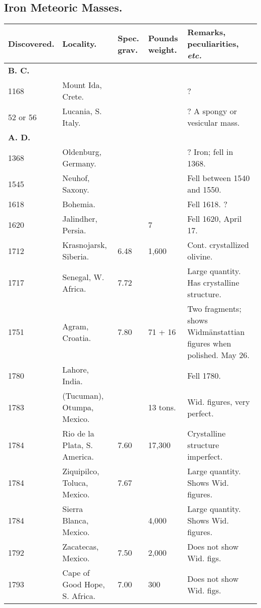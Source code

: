 \documentclass[a4paper, 12pt, oneside]{article}
\begin{document}
\subsection{Iron Meteoric Masses.}
\begin{center}
    \footnotesize
    \begin{longtable}{|p{16mm}|p{34mm}|p{10mm}|p{12mm}|p{40mm}|}
    \hline
        Discovered. & Locality. & Spec. grav. & Pounds weight. & Remarks, peculiarities, \emph{etc.} \\ \hline
        \textbf{B. C.} & ~ & ~ & ~ & ~ \\
        1168 & Mount Ida, Crete. & ~ & ~ & ? \\
        52 or 56 & Lucania, S. Italy. & ~ & ~ & ? A spongy or vesicular mass. \\
        \textbf{A. D.} & ~ & ~ & ~ & ~ \\
        1368 & Oldenburg, Germany. & ~ & ~ & ? Iron; fell in 1368. \\
        1545 & Neuhof, Saxony. & ~ & ~ & Fell between 1540 and 1550. \\
        1618 & Bohemia. & ~ & ~ & Fell 1618. ? \\
        1620 & Jalindher, Persia. & ~ & 7 & Fell 1620, April 17. \\
        1712 & Krasnojarsk, Siberia. & 6.48 & 1,600 & Cont. crystallized olivine. \\
        1717 & Senegal, W. Africa. & 7.72 & ~ & Large quantity. Has crystalline structure. \\
        1751 & Agram, Croatia. & 7.80 & 71 + 16 & Two fragments; shows Widmänstattian figures when polished. May 26. \\
        1780 & Lahore, India. & ~ & ~ & Fell 1780. \\
        1783 & (Tucuman), Otumpa, Mexico. & ~ & 13 tons. & Wid. figures, very perfect. \\
        1784 & Rio de la Plata, S. America. & 7.60 & 17,300 & Crystalline structure imperfect. \\
        1784 & Ziquipilco, Toluca, Mexico. & 7.67 & ~ & Large quantity. Shows Wid. figures. \\
        1784 & Sierra Blanca, Mexico. & ~ & 4,000 & Large quantity. Shows Wid. figures. \\
        1792 & Zacatecas, Mexico. & 7.50 & 2,000 & Does not show Wid. figs. \\
        1793 & Cape of Good Hope, S. Africa. & 7.00 & 300 & Does not show Wid. figs. \\

\end{longtable}
\end{center}
\end{document}
